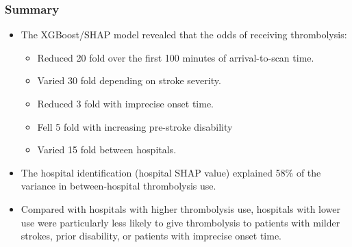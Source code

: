 \documentclass{beamer}
\begin{document}

\begin{frame}
\frametitle{Summary}
\small

\begin{itemize}
    \item The XGBoost/SHAP model revealed that the odds of receiving thrombolysis:



    \begin{itemize}
        \item Reduced 20 fold over the first 100 minutes of arrival-to-scan time.
        \item Varied 30 fold depending on stroke severity.
        \item Reduced 3 fold with imprecise onset time.
        \item Fell 5 fold with increasing pre-stroke disability
        \item Varied 15 fold between hospitals. 
    \end{itemize}

\item The hospital identification (hospital SHAP value) explained 58\% of the variance in between-hospital thrombolysis use. 

\item Compared with hospitals with higher thrombolysis use, hospitals with lower use were particularly less likely to give thrombolysis to patients with milder strokes, prior disability, or patients with imprecise onset time.
\end{itemize}

\end{frame}

\end{document}
